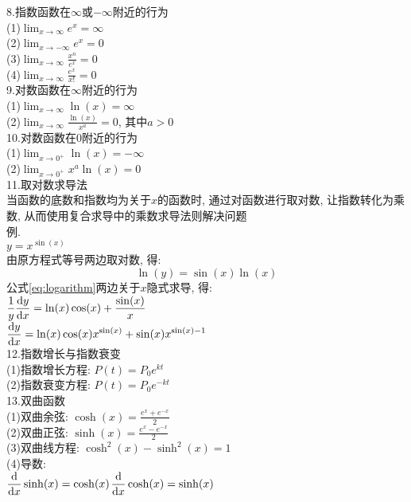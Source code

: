 8.指数函数在$\infty$或$-\infty$附近的行为\\[1ex]
(1)\quad$\displaystyle\lim_{x\to\infty}e^x=\infty$\\[1ex]
(2)\quad$\displaystyle\lim_{x\to -\infty}e^x=0$\\[1ex]
(3)\quad$\displaystyle\lim_{x\to\infty}\frac{x^n}{e^x}=0$\\[1ex]
(4)\quad$\displaystyle\lim_{x\to\infty}\frac{e^x}{x!}=0$\\[1ex]

9.对数函数在$\infty$附近的行为\\[1ex]
(1)\quad$\displaystyle\lim_{x\to\infty}\ln(x)=\infty$\\[1ex]
(2)\quad$\displaystyle\lim_{x\to\infty}\frac{\ln(x)}{x^a}=0$, 其中$a>0$\\[1ex]

10.对数函数在0附近的行为\\[1ex]
(1)\quad$\displaystyle\lim_{x\to 0^+}\ln(x)=-\infty$\\[1ex]
(2)\quad$\displaystyle\lim_{x\to 0^+}x^a\ln(x)=0$\\[1ex]

11.取对数求导法\\
当函数的底数和指数均为关于$x$的函数时, 通过对函数进行取对数, 让指数转化为乘数, 从而使用复合求导中的乘数求导法则解决问题\\
例.\\[1ex]
$\displaystyle y=x^{\sin(x)}$\\[1ex]
由原方程式等号两边取对数, 得:\\
\begin{equation}
\ln(y)=\sin(x)\ln(x)\label{eq:logarithm}
\end{equation}
公式\eqref{eq:logarithm}两边关于$x$隐式求导, 得:\\[1ex]
$\displaystyle\frac{1}{y}\frac{\mathop{}\!\mathrm{d} y}{\mathop{}\!\mathrm{d} x}=\ln(x)\cos(x)+\frac{\sin(x)}{x}$\\[1ex]
$\displaystyle\frac{\mathop{}\!\mathrm{d} y}{\mathop{}\!\mathrm{d} x}=\ln(x)\cos(x)x^{\sin(x)}+\sin(x)x^{\sin(x)-1}$\\[1ex]

12.指数增长与指数衰变\\
(1)指数增长方程: $P(t)=P_0e^{kt}$\\
(2)指数衰变方程: $P(t)=P_0e^{-kt}$\\

13.双曲函数\\[1ex]
(1)双曲余弦: $\displaystyle\cosh(x)=\frac{e^x+e^{-x}}{2}$\\[1ex]
(2)双曲正弦: $\displaystyle\sinh(x)=\frac{e^x-e^{-x}}{2}$\\[1ex]
(3)双曲线方程: $\cosh^2(x)-\sinh^2(x)=1$\\[1ex]
(4)导数:\\[1ex]
$\displaystyle\frac{\mathop{}\!\mathrm{d} }{\mathop{}\!\mathrm{d} x}\sinh(x)=\cosh(x)$\qquad$\displaystyle\frac{\mathop{}\!\mathrm{d} }{\mathop{}\!\mathrm{d} x}\cosh(x)=\sinh(x)$\\[1ex]
